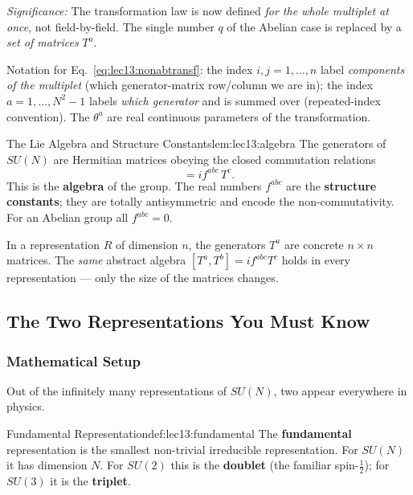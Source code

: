 \documentclass[../main.tex]{subfiles}
\begin{document}
\textit{Significance:} The transformation law is now defined \emph{for the whole multiplet at once}, not field-by-field. The single number $q$ of the Abelian case is replaced by a \emph{set of matrices} $T^a$.

\begin{note}
Notation for Eq.~\eqref{eq:lec13:nonabtransf}: the index $i,j=1,\dots,n$ label \emph{components of the multiplet} (which generator-matrix row/column we are in); the index $a=1,\dots,N^2-1$ labels \emph{which generator} and is summed over (repeated-index convention). The $\theta^a$ are real continuous parameters of the transformation.
\end{note}

\begin{Lemma}{The Lie Algebra and Structure Constants}{lem:lec13:algebra}
The generators of $SU(N)$ are Hermitian matrices obeying the closed commutation relations
\begin{equation*}
  [\,T^a, T^b\,] = i f^{abc}\, T^c .
\end{equation*}
This is the \textbf{algebra} of the group. The real numbers $f^{abc}$ are the \textbf{structure constants}; they are totally antisymmetric and encode the non-commutativity. For an Abelian group all $f^{abc}=0$.
\end{Lemma}

In a representation $R$ of dimension $n$, the generators $T^a$ are concrete $n\times n$ matrices. The \emph{same} abstract algebra $[T^a,T^b]=if^{abc}T^c$ holds in every representation --- only the size of the matrices changes.

\subsection{The Two Representations You Must Know}\label{sec:lec13:reps}

\subsubsection*{Mathematical Setup}

Out of the infinitely many representations of $SU(N)$, two appear everywhere in physics.

\begin{Definition}{Fundamental Representation}{def:lec13:fundamental}
The \textbf{fundamental} representation is the smallest non-trivial irreducible representation. For $SU(N)$ it has dimension $N$. For $SU(2)$ this is the \textbf{doublet} (the familiar spin-$\tfrac12$); for $SU(3)$ it is the \textbf{triplet}.
\end{Definition}
\end{document}
